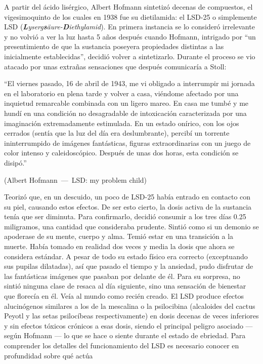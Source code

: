A partir del ácido lisérgico, Albert Hofmann sintetizó decenas de compuestos, el vigesimoquinto de los cuales en 1938 fue su dietilamida: el LSD-25 o simplemente LSD (\textit{\textbf{L}yserg\textbf{s}äure-\textbf{D}iethylamid}). En primera instancia se lo consideró irrelevante y no volvió a ver la luz hasta 5 años después cuando Hofmann, intrigado por \enquote{un presentimiento de que la sustancia poseyera propiedades distintas a las inicialmente establecidas}, decidió volver a sintetizarlo. Durante el proceso se vio atacado por unas extrañas sensaciones que después comunicaría a Stoll:

\let\oldquote\quote
\let\endoldquote\endquote
\renewenvironment{quote}[2][]
  {\if\relax\detokenize{#1}\relax
     \def\quoteauthor{#2}%
   \else
     \def\quoteauthor{#2~---~#1}%
   \fi
   \oldquote}
  {\par\nobreak\smallskip\hfill(\quoteauthor)%
   \endoldquote\addvspace{\bigskipamount}}

\begin{quote}[LSD: my problem child]{Albert Hofmann}
	\enquote{El viernes pasado, 16 de abril de 1943, me vi obligado a interrumpir mi jornada en el laboratorio en plena tarde y volver a casa, viéndome afectado por una inquietud remarcable combinada con un ligero mareo. En casa me tumbé y me hundí en una condición no desagradable de intoxicación caracterizada por una imaginación extremadamente estimulada. En un estado onírico, con los ojos cerrados (sentía que la luz del día era deslumbrante), percibí un torrente ininterrumpido de imágenes fantásticas, figuras extraordinarias con un juego de color intenso y caleidoscópico. Después de unas dos horas, esta condición se disipó.}
\end{quote}

Teorizó que, en un descuido, un poco de LSD-25 había entrado en contacto con su piel, causando estos efectos. De ser esto cierto, la dosis activa de la sustancia tenía que ser diminuta. Para confirmarlo, decidió consumir a los tres días 0.25 miligramos, una cantidad que consideraba prudente. Sintió como si un demonio se apoderase de su mente, cuerpo y alma. Temió estar en una transición a la muerte. Había tomado en realidad dos veces y media la dosis que ahora se considera estándar. A pesar de todo su estado físico era correcto (exceptuando sus pupilas dilatadas), así que pasado el tiempo y la ansiedad, pudo disfrutar de las fantásticas imágenes que pasaban por delante de él. Para su sorpresa, no sintió ninguna clase de resaca al día siguiente, sino una sensación de bienestar que florecía en él. Veía al mundo como recién creado. El LSD produce efectos alucinógenos similares a los de la mescalina o la psilocibina (alcaloides del cactus Peyotl y las setas psilocíbeas respectivamente) en dosis decenas de veces inferiores y sin efectos tóxicos crónicos a esas dosis, siendo el principal peligro asociado --- según Hofmann --- lo que se hace o siente durante el estado de ebriedad. Para comprender los detalles del funcionamiento del LSD es necesario conocer en profundidad sobre qué actúa

\newpage
